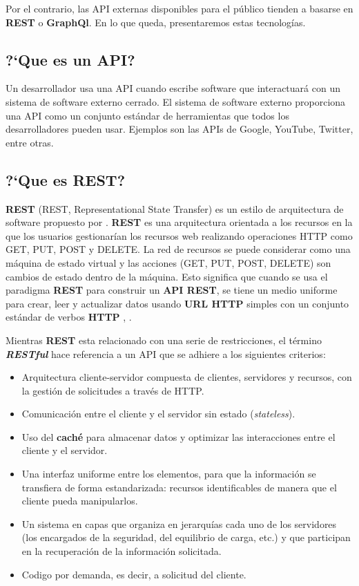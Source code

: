 Por el contrario, las API externas disponibles para el público tienden a basarse en \textbf{REST}  o \textbf{GraphQl}. En lo que queda, presentaremos estas tecnolog\'ias.

\subsection{ ?`Que es un API?}
 
Un desarrollador usa una \gls{API} cuando escribe software que interactuará con un sistema de software externo cerrado. El sistema de software externo proporciona una API como un conjunto estándar de herramientas que todos los desarrolladores pueden usar. Ejemplos  son las APIs de  Google,  YouTube, Twitter, entre otras. 

\subsection{ ?`Que es REST?}

\textbf{REST} (REST, Representational State Transfer) es un estilo de arquitectura de software propuesto por . 
\textbf{REST} es una arquitectura orientada a los recursos en la que los usuarios gestionarían los recursos web realizando operaciones HTTP como GET, PUT, POST y DELETE. La red de recursos se puede considerar como una máquina de estado virtual y las acciones (GET, PUT, POST, DELETE) son cambios de estado dentro de la máquina. 
Esto significa  que cuando se usa el paradigma \textbf{REST} para construir un \textbf{API REST}, se tiene un medio uniforme para crear, leer y actualizar datos usando \textbf{URL HTTP} simples con un conjunto estándar de verbos \textbf{HTTP} , .

Mientras \textbf{REST} esta relacionado con una serie de restricciones, el t\'ermino \textit{\textbf{RESTful}} hace referencia a un API que se adhiere a los siguientes criterios:

\begin{itemize}
	\item Arquitectura cliente-servidor compuesta de clientes, servidores y recursos, con la gestión de solicitudes a través de HTTP.
	\item Comunicación entre el cliente y el servidor \gls{sin estado} (\textit{stateless}).
	\item Uso del \textbf{caché} para almacenar datos  y optimizar las interacciones entre el cliente y el servidor.
	\item Una interfaz uniforme entre los elementos, para que la información se transfiera de forma estandarizada: recursos identificables de manera que el cliente pueda manipularlos.
	\item Un sistema en capas que organiza en jerarquías  cada uno de los servidores (los encargados de la seguridad, del equilibrio de carga, etc.) y que participan en la recuperación de la información solicitada.
	\item\gls{Codigo por demanda}, es decir, a solicitud del cliente. 
\end{itemize}

